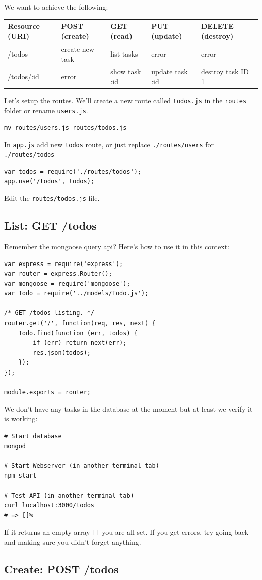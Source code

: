 \documentclass[12pt]{article}
\begin{document}
We want to achieve the following:
\begin{longtable}[]{@{}lllll@{}}
\toprule
Resource (URI) & POST (create) & GET (read) & PUT (update) & DELETE
(destroy)\tabularnewline
\midrule
\endhead
/todos & create new task & list tasks & error & error\tabularnewline
/todos/:id & error & show task :id & update task :id & destroy task ID
1\tabularnewline
\bottomrule
\end{longtable}
\noindent Let's setup the routes.
We'll create a new route called \verb!todos.js! in the \verb!routes! folder or rename
\verb!users.js!.
\begin{Verbatim}
mv routes/users.js routes/todos.js
\end{Verbatim}
In \texttt{app.js} add new \texttt{todos} route, or just replace
\texttt{./routes/users} for \texttt{./routes/todos}
\begin{Verbatim}
var todos = require('./routes/todos');
app.use('/todos', todos);
\end{Verbatim}
Edit the \texttt{routes/todos.js} file.

\subsection{List: GET /todos}

Remember the mongoose query api? Here's how to use it in this context:
\begin{Verbatim}
var express = require('express');
var router = express.Router();
var mongoose = require('mongoose');
var Todo = require('../models/Todo.js');

/* GET /todos listing. */
router.get('/', function(req, res, next) {  
	Todo.find(function (err, todos) {    
		if (err) return next(err);    
		res.json(todos);  
	});
});

module.exports = router;
\end{Verbatim}
We don't have any tasks in the database at the moment but at least we verify it is working:
\begin{Verbatim}
# Start database
mongod

# Start Webserver (in another terminal tab)
npm start

# Test API (in another terminal tab)
curl localhost:3000/todos
# => []%
\end{Verbatim}
If it returns an empty array \verb![]! you are all set. If you get
errors, try going back and making sure you didn't forget anything.

\subsection{Create: POST /todos}
\end{document}
